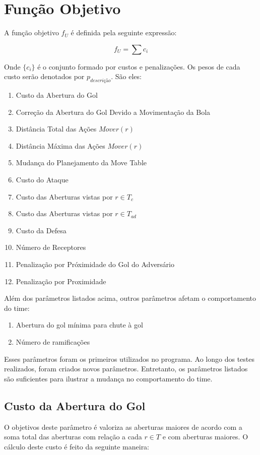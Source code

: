 \section{Função Objetivo}
A função objetivo $f_U$ é definida pela seguinte
expressão:

\begin{dmath}
  f_U = \sum c_i 
\end{dmath}

Onde $\lbrace c_i \rbrace$ é o conjunto formado
por custos e penalizações. Os pesos de cada custo
serão denotados por $p_{descrição}$. São eles:
\begin{enumerate}
  \item Custo da Abertura do Gol
  \item Correção da Abertura do Gol Devido a Movimentação da Bola
  \item Distância Total das Ações $Mover(r)$
  \item Distância Máxima das Ações $Mover(r)$
  \item Mudança do Planejamento da Move Table
  \item Custo do Ataque
  \item Custo das Aberturas vistas por $r \in T_c$
  \item Custo das Aberturas vistas por $r \in T_{ad}$
  \item Custo da Defesa
  \item Número de Receptores
  \item Penalização por Próximidade do Gol do Adversário
  \item Penalização por Proximidade
\end{enumerate}

Além dos parâmetros listados acima, outros parâmetros
afetam o comportamento do time:
\begin{enumerate}
  \item Abertura do gol mínima para chute à gol
  \item Número de ramificações
\end{enumerate}

Esses parâmetros foram os primeiros utilizados no programa.
Ao longo dos testes realizados, foram criados novos parâmetros.
Entretanto, os parâmetros listados são suficientes para ilustrar
a mudança no comportamento do time.

\subsection{Custo da Abertura do Gol}\label{subsec:custo_gap}
O objetivos deste parâmetro é valoriza as aberturas maiores
de acordo com a soma total das aberturas com relação a cada
$r \in T$ e com aberturas maiores.
O cálculo deste custo é feito da seguinte maneira:

